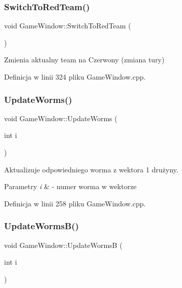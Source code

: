 \subsubsection{\texorpdfstring{Switch\+To\+Red\+Team()}{SwitchToRedTeam()}}
{\footnotesize\ttfamily void Game\+Window\+::\+Switch\+To\+Red\+Team (\begin{DoxyParamCaption}{ }\end{DoxyParamCaption})}



Zmienia aktualny team na Czerwony (zmiana tury) 



Definicja w linii 324 pliku Game\+Window.\+cpp.

\mbox{\label{class_game_window_a043804fa483c8ea2f348b6fb1dac4e4a}} 
\subsubsection{\texorpdfstring{Update\+Worms()}{UpdateWorms()}}
{\footnotesize\ttfamily void Game\+Window\+::\+Update\+Worms (\begin{DoxyParamCaption}\item[{int}]{i }\end{DoxyParamCaption})}



Aktualizuje odpowiedniego worma z wektora 1 drużyny. 


\begin{DoxyParams}{Parametry}
{\em i} & -\/ numer worma w wektorze \\
\hline
\end{DoxyParams}


Definicja w linii 258 pliku Game\+Window.\+cpp.

\mbox{\label{class_game_window_aa6659ccbd2a5d27141eb3f00fdc72ea6}} 
\subsubsection{\texorpdfstring{Update\+Worms\+B()}{UpdateWormsB()}}
{\footnotesize\ttfamily void Game\+Window\+::\+Update\+WormsB (\begin{DoxyParamCaption}\item[{int}]{i }\end{DoxyParamCaption})}



